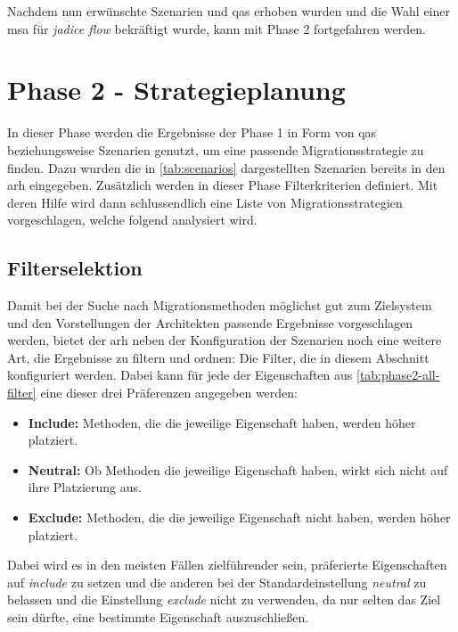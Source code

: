 Nachdem nun erwünschte Szenarien und \glspl{qa} erhoben wurden und die Wahl einer \gls{msa} für \emph{jadice flow} bekräftigt wurde, kann mit Phase 2 fortgefahren werden.

\section{Phase 2 - Strategieplanung}
\label{sec:durchführung-phase2}

In dieser Phase werden die Ergebnisse der Phase 1 in Form von \glspl{qa} beziehungsweise Szenarien genutzt, um eine passende Migrationsstrategie zu finden.
Dazu wurden die in \cref{tab:scenarios} dargestellten Szenarien bereits in den \gls{arh} eingegeben.
Zusätzlich werden in dieser Phase Filterkriterien definiert.
Mit deren Hilfe wird dann schlussendlich eine Liste von Migrationsstrategien vorgeschlagen, welche folgend analysiert wird.

\subsection{Filterselektion}
\label{sec:filterselektion}
Damit bei der Suche nach Migrationsmethoden möglichst gut zum Zielsystem und den Vorstellungen der Architekten passende Ergebnisse vorgeschlagen werden, bietet der \gls{arh} neben der Konfiguration der Szenarien noch eine weitere Art, die Ergebnisse zu filtern und ordnen: Die Filter, die in diesem Abschnitt konfiguriert werden.
Dabei kann für jede der Eigenschaften aus \cref{tab:phase2-all-filter} eine dieser drei Präferenzen angegeben werden:
\begin{itemize}
	\item \textbf{Include:} Methoden, die die jeweilige Eigenschaft haben, werden höher platziert.
	\item \textbf{Neutral:} Ob Methoden die jeweilige Eigenschaft haben, wirkt sich nicht auf ihre Platzierung aus.
	\item \textbf{Exclude:} Methoden, die die jeweilige Eigenschaft nicht haben, werden höher platziert.
\end{itemize}
Dabei wird es in den meisten Fällen zielführender sein, präferierte Eigenschaften auf \emph{include} zu setzen und die anderen bei der Standardeinstellung \emph{neutral} zu belassen und die Einstellung \emph{exclude} nicht zu verwenden, da nur selten das Ziel sein dürfte, eine bestimmte Eigenschaft auszuschließen.



